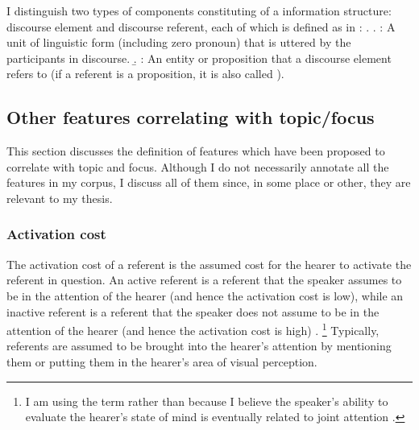 
I distinguish two types of components constituting of a information structure:
discourse element and discourse referent,
each of which is defined as in \Next:
\ex.
	\a. : {A unit of linguistic form (including zero pronoun) that is uttered by the participants in discourse.}
	\b. : {An entity or proposition that a discourse element refers to (if a referent is a proposition, it is also called ).}



\subsection{Other features correlating with topic/focus}\label{FrameworkOthFeatures}

This section discusses the definition of features which have been
proposed to correlate with topic and focus.
Although I do not necessarily annotate all the features in my corpus,
I discuss all of them
since, in some place or other, they are relevant to my thesis.



\subsubsection{Activation cost}\label{FrameworkActivation}
The activation cost of a referent is the assumed cost for the hearer to activate the referent in question.
An active referent is a referent
that the speaker assumes to be in the attention of the hearer (and hence the activation cost is low),
while an inactive referent is a referent
that the speaker does not assume to be in the attention of the hearer (and hence the activation cost is high)
\cite[see also][inter alia]{chafe94}.%
	\footnote{
	I am using the term  rather than 
	because I believe the speaker's ability to evaluate the hearer's state of mind is eventually related to joint attention \cite{tomasello99}.
	}
Typically,
referents are assumed to be brought into the hearer's attention
by mentioning them or putting them in the hearer's area of visual perception.

